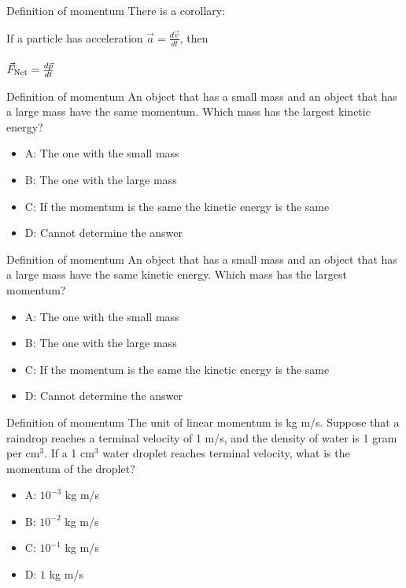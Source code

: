 \documentclass{beamer}
\begin{document}
\begin{frame}{Definition of momentum}
There is a corollary: \\ \vspace{1cm}
\begin{tcolorbox}[colback=white,colframe=red!40!blue,title=Newton's Second Law with momentum]
\alert{If a particle has acceleration $\vec{a} = \frac{d\vec{v}}{dt}$, then} \\ \\
\alert{$\vec{F}_{\rm Net} = \frac{d\vec{p}}{dt}$}
\end{tcolorbox}
\end{frame}

\begin{frame}{Definition of momentum}
An object that has a small mass and an object that has a large mass have the same momentum. Which mass has the largest kinetic energy?
\begin{itemize}
\item A: The one with the small mass
\item B: The one with the large mass
\item C: If the momentum is the same the kinetic energy is the same
\item D: Cannot determine the answer
\end{itemize}
\end{frame}

\begin{frame}{Definition of momentum}
An object that has a small mass and an object that has a large mass have the same kinetic energy. Which mass has the largest momentum?
\begin{itemize}
\item A: The one with the small mass
\item B: The one with the large mass
\item C: If the momentum is the same the kinetic energy is the same
\item D: Cannot determine the answer
\end{itemize}
\end{frame}

\begin{frame}{Definition of momentum}
The unit of linear momentum is kg m/s.  Suppose that a raindrop reaches a terminal velocity of 1 m/s, and the density of water is 1 gram per cm$^3$.  If a 1 cm$^3$ water droplet reaches terminal velocity, what is the momentum of the droplet?
\begin{itemize}
\item A: $10^{-3}$ kg m/s
\item B: $10^{-2}$ kg m/s
\item C: $10^{-1}$ kg m/s
\item D: $1$ kg m/s
\end{itemize}
\end{frame}
\end{document}
